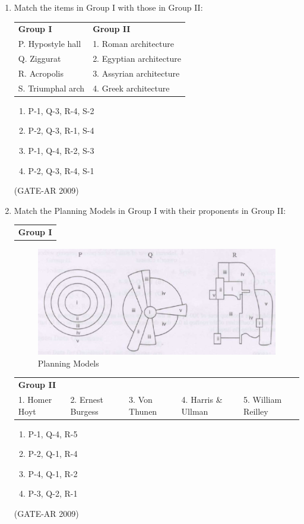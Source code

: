 \documentclass[a4paper,10pt]{article}
\begin{document}
\begin{enumerate}
    \item Match the items in Group I with those in Group II:  \\
    \begin{tabular}{ l l }
	\textbf{Group I} & \textbf{Group II} \\
	P. Hypostyle hall & 1. Roman architecture \\
	Q. Ziggurat & 2. Egyptian architecture \\
	R. Acropolis & 3. Assyrian architecture \\
	S. Triumphal arch & 4. Greek architecture \\
	\end{tabular}
	\begin{multicols}{2}
	\begin{enumerate}
        \item P-1, Q-3, R-4, S-2
        \item P-2, Q-3, R-1, S-4
        \item P-1, Q-4, R-2, S-3
        \item P-2, Q-3, R-4, S-1
    \end{enumerate}
	\end{multicols}
    \hfill (GATE-AR 2009)

    \item Match the Planning Models in Group I with their proponents in Group II:  \\
    \begin{tabular}{ l }
	\textbf{Group I} \\
	\end{tabular}
	\begin{figure}[h!]
        \centering
        \includegraphics[width=0.5\linewidth]{figs/img_03.jpg}
	\caption{Planning Models}
	\label{fig:Img03}
	\end{figure}
    \begin{tabular}{ l l l l l }
	\textbf{Group II} & & \\
	1. Homer Hoyt & 2. Ernest Burgess & 3. Von Thunen & 4. Harris \& Ullman & 5. William Reilley \\
	\end{tabular}
	\begin{multicols}{2}
	\begin{enumerate}
        \item P-1, Q-4, R-5
        \item P-2, Q-1, R-4
        \item P-4, Q-1, R-2
        \item P-3, Q-2, R-1
    \end{enumerate}
	\end{multicols}
    \hfill (GATE-AR 2009)


\end{enumerate}
\end{document}
